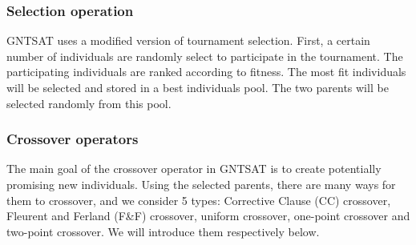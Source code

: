 \subsubsection{Selection operation}
GNTSAT uses a modified version of tournament selection. First, a certain
number of individuals are randomly select to participate in the tournament.
The participating individuals are ranked according to fitness. The most fit
individuals will be selected and stored in a best individuals pool. The two
parents will be selected randomly from this pool.

\subsubsection{Crossover operators}
The main goal of the crossover operator in GNTSAT is to create potentially
promising new individuals. Using the selected parents, there are many ways for
them to crossover, and we consider 5 types: Corrective Clause (CC) crossover,
Fleurent and Ferland (F\&F) crossover, uniform crossover, one-point crossover
and two-point crossover. We will introduce them respectively below.


